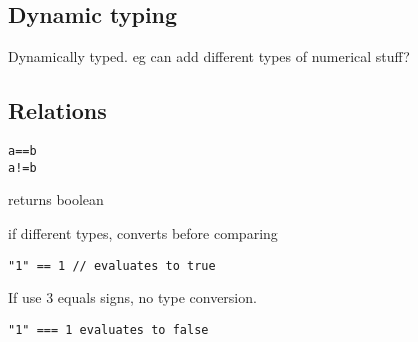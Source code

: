 \begin{verbatim}

\end{verbatim}

\subsection{Dynamic typing}

Dynamically typed. eg can add different types of numerical stuff?

\subsection{Relations}

\begin{verbatim}
a==b 
a!=b
\end{verbatim}

returns boolean

if different types, converts before comparing

\begin{verbatim}
"1" == 1 // evaluates to true
\end{verbatim}

If use \(3\) equals signs, no type conversion.

\begin{verbatim}
"1" === 1 evaluates to false
\end{verbatim}

